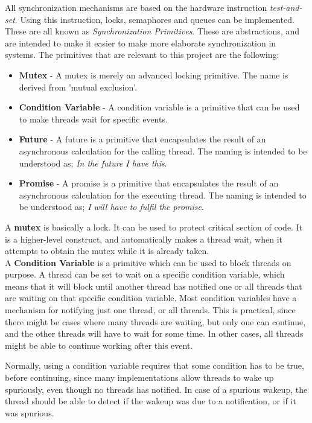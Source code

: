 \documentclass[a4paper]{article}
\begin{document}
All synchronization mechanisms are based on the hardware instruction \textit{test-and-set}. Using this instruction, locks, semaphores and queues can be implemented. These are all known as \textit{Synchronization Primitives}. These are abstractions, and are intended to make it easier to make more elaborate synchronization in systems. The primitives that are relevant to this project are the following:

\begin{itemize}
\item \textbf{Mutex} - A mutex is merely an advanced locking primitive. The name is derived from 'mutual exclusion'.
\item \textbf{Condition Variable} - A condition variable is a primitive that can be used to make threads wait for specific events.
\item \textbf{Future} - A future is a primitive that encapsulates the result of an asynchronous calculation for the calling thread. The naming is intended to be understood as; \textit{In the future I have this}.
\item \textbf{Promise} - A promise is a primitive that encapsulates the result of an asynchronous calculation for the executing thread. The naming is intended to be understood as; \textit{I will have to fulfil the promise}.
\end{itemize}


A \textbf{mutex} is basically a lock. It can be used to protect critical section of code. It is a higher-level construct, and automatically makes a thread wait, when it attempts to obtain the mutex while it is already taken.\\

A \textbf{Condition Variable} is a primitive which can be used to block threads on purpose. A thread can be set to wait on a specific condition variable, which means that it will block until another thread has notified one or all threads that are waiting on that specific condition variable. Most condition variables have a mechanism for notifying just one thread, or all threads. This is practical, since there might be cases where many threads are waiting, but only one can continue, and the other threads will have to wait for some time. In other cases, all threads might be able to continue working after this event. 

Normally, using a condition variable requires that some condition has to be true, before continuing, since many implementations allow threads to wake up spuriously, even though no threads has notified. In case of a spurious wakeup, the thread should be able to detect if the wakeup was due to a notification, or if it was spurious.\\
\end{document}
